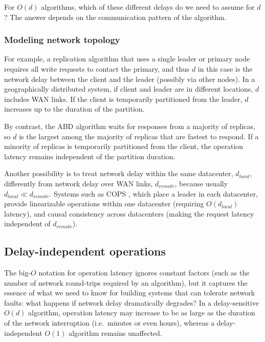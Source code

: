 \documentclass[fleqn,12pt,lineno]{wlpeerj} %
\begin{document}
For $O(d)$ algorithms, which of these different delays do we need to assume for $d$? The answer
depends on the communication pattern of the algorithm.

\subsubsection{Modeling network topology}

For example, a replication algorithm that uses a single leader or primary node requires all write
requests to contact the primary, and thus $d$ in this case is the network delay between the client
and the leader (possibly via other nodes). In a geographically distributed system, if client and
leader are in different locations, $d$ includes WAN links. If the client is temporarily partitioned
from the leader, $d$ increases up to the duration of the partition.

By contrast, the ABD algorithm \citep{Attiya1995bm} waits for responses from a majority of replicas,
so $d$ is the largest among the majority of replicas that are fastest to respond. If a minority of
replicas is temporarily partitioned from the client, the operation latency remains independent of
the partition duration.

Another possibility is to treat network delay within the same datacenter, $d_\textit{local}$,
differently from network delay over WAN links, $d_\textit{remote}$, because usually
$d_\textit{local} \ll d_\textit{remote}$. Systems such as COPS \citep{Lloyd2011hz}, which place a
leader in each datacenter, provide linearizable operations within one datacenter (requiring
$O(d_\textit{local})$ latency), and causal consistency across datacenters (making the request
latency independent of $d_\textit{remote}$).


\subsection{Delay-independent operations}\label{sec:disconnected}

The big-$O$ notation for operation latency ignores constant factors (such as the number of network
round-trips required by an algorithm), but it captures the essence of what we need to know for
building systems that can tolerate network faults: what happens if network delay dramatically
degrades? In a delay-sensitive $O(d)$ algorithm, operation latency may increase to be as large as
the duration of the network interruption (i.e.\ minutes or even hours), whereas a delay-independent
$O(1)$ algorithm remains unaffected.
\end{document}
